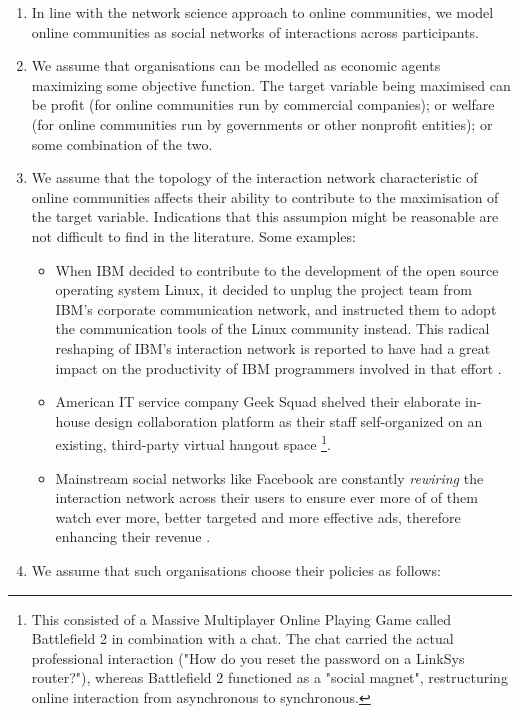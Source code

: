 \documentclass{nws}
\begin{document}
\begin{enumerate}
\item In line with the network science approach to online communities, we model online communities as social networks of interactions across participants. 
\item We assume that organisations can be modelled as economic agents maximizing some objective function. The target variable being maximised can be profit (for online communities run by commercial companies); or welfare (for online communities run by governments or other nonprofit entities); or some combination of the two. 
\item We assume that the topology of the interaction network characteristic of online communities affects their ability to contribute to the maximisation of the target variable. Indications that this assumpion might be reasonable are not difficult to find in the literature. Some examples:
    \begin{itemize}
	\item When IBM decided to contribute to the development of the open source operating system Linux, it decided to unplug the project team from IBM's corporate communication network, and instructed them to adopt the communication tools of the Linux community instead. This radical reshaping of IBM's interaction network is reported to have had a great impact on the productivity of IBM programmers involved in that effort \cite{tapscott2008wikinomics}. 
	\item American IT service company Geek Squad shelved their elaborate in-house design collaboration platform as their staff self-organized on an existing, third-party virtual hangout space \cite{tapscott2008wikinomics} \footnote{This consisted of a Massive Multiplayer Online Playing Game called Battlefield 2 in combination with a chat. The chat carried the actual professional interaction ("How do you reset the password on a LinkSys router?"), whereas Battlefield 2 functioned as a "social magnet", restructuring online interaction from asynchronous to synchronous.}. 
	\item Mainstream social networks like Facebook are constantly \emph{rewiring} the interaction network across their users to ensure ever more of of them watch ever more, better targeted and more effective ads, therefore enhancing their revenue \cite{slegg2014facebook}.
	\end{itemize}
\item We assume that such organisations choose their policies as follows: 
    \begin{itemize} 

\end{itemize}
\end{enumerate}
\end{document}
